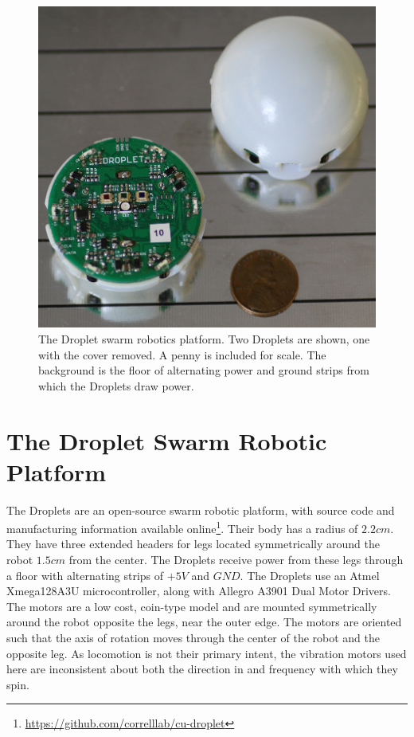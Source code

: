 \documentclass[letterpaper, 10pt, conference]{ieeeconf}
\begin{document}
\begin{figure}[!htb]
	\centering
		\includegraphics[width=0.8\columnwidth]{./Images/droplets.png}
	\caption{The Droplet swarm robotics platform. Two Droplets are shown, one with the cover removed. A penny is included for scale. The background is the floor of alternating power and ground strips from which the Droplets draw power.}
	\label{droplets}
\end{figure}


\section{The Droplet Swarm Robotic Platform}
The Droplets are an open-source swarm robotic platform, with source code and manufacturing information available online\footnote{\url{https://github.com/correlllab/cu-droplet}}. Their body has a radius of $2.2cm$. They have three extended headers for legs located symmetrically around the robot $1.5cm$ from the center. The Droplets receive power from these legs through a floor with alternating strips of $+5V$ and $GND$. The Droplets use an Atmel Xmega128A3U microcontroller, along with Allegro A3901 Dual Motor Drivers. The motors are a low cost, coin-type model and are mounted symmetrically around the robot opposite the legs, near the outer edge. The motors are oriented such that the axis of rotation moves through the center of the robot and the opposite leg. As locomotion is not their primary intent, the vibration motors used here are inconsistent about both the direction in and frequency with which they spin.
\end{document}
